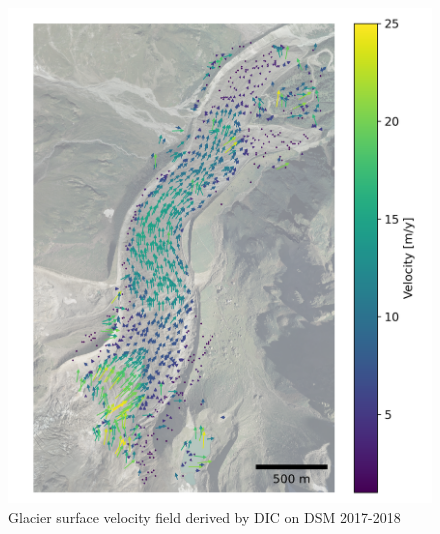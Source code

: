 \begin{figure}
    \centering
    \includegraphics[height=\textheight]{figures/chapter3/velocity_DIC_2017-2018.png}
    \caption{Glacier surface velocity field derived by DIC on DSM 2017-2018}
\end{figure}

